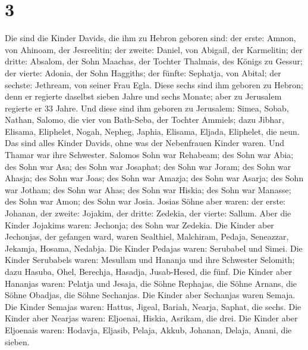 \hypertarget{section-2}{%
\section{3}\label{section-2}}

 Die sind die Kinder Davids, die ihm zu Hebron geboren
sind: der erste: Amnon, von Ahinoam, der Jesreelitin; der zweite:
Daniel, von Abigail, der Karmelitin;  der dritte: Absalom,
der Sohn Maachas, der Tochter Thalmais, des Königs zu Gessur; der
vierte: Adonia, der Sohn Haggiths;  der fünfte: Sephatja,
von Abital; der sechste: Jethream, von seiner Frau Egla. 
Diese sechs sind ihm geboren zu Hebron; denn er regierte daselbst sieben
Jahre und sechs Monate; aber zu Jerusalem regierte er 33 Jahre.
 Und diese sind ihm geboren zu Jerusalem: Simea, Sobab,
Nathan, Salomo, die vier von Bath-Seba, der Tochter Ammiels;
 dazu Jibhar, Elisama, Eliphelet,  Nogah,
Nepheg, Japhia,  Elisama, Eljada, Eliphelet, die neun.
 Das sind alles Kinder Davids, ohne was der Nebenfrauen
Kinder waren. Und Thamar war ihre Schwester.  Salomos
Sohn war Rehabeam; des Sohn war Abia; des Sohn war Asa; des Sohn war
Josaphat;  des Sohn war Joram; des Sohn war Ahasja; des
Sohn war Joas;  des Sohn war Amazja; des Sohn war Asarja;
des Sohn war Jotham;  des Sohn war Ahas; des Sohn war
Hiskia; des Sohn war Manasse;  des Sohn war Amon; des
Sohn war Josia.  Josias Söhne aber waren: der erste:
Johanan, der zweite: Jojakim, der dritte: Zedekia, der vierte: Sallum.
 Aber die Kinder Jojakims waren: Jechonja; des Sohn war
Zedekia.  Die Kinder aber Jechonjas, der gefangen ward,
waren Sealthiel,  Malchiram, Pedaja, Seneazzar, Jekamja,
Hosama, Nedabja.  Die Kinder Pedajas waren: Serubabel und
Simei. Die Kinder Serubabels waren: Mesullam und Hananja und ihre
Schwester Selomith;  dazu Hasuba, Ohel, Berechja,
Hasadja, Jusab-Hesed, die fünf.  Die Kinder aber Hananjas
waren: Pelatja und Jesaja, die Söhne Rephajas, die Söhne Arnans, die
Söhne Obadjas, die Söhne Sechanjas.  Die Kinder aber
Sechanjas waren Semaja. Die Kinder Semajas waren: Hattus, Jigeal,
Bariah, Nearja, Saphat, die sechs.  Die Kinder aber
Nearjas waren: Eljoenai, Hiskia, Asrikam, die drei.  Die
Kinder aber Eljoenais waren: Hodavja, Eljasib, Pelaja, Akkub, Johanan,
Delaja, Anani, die sieben.

